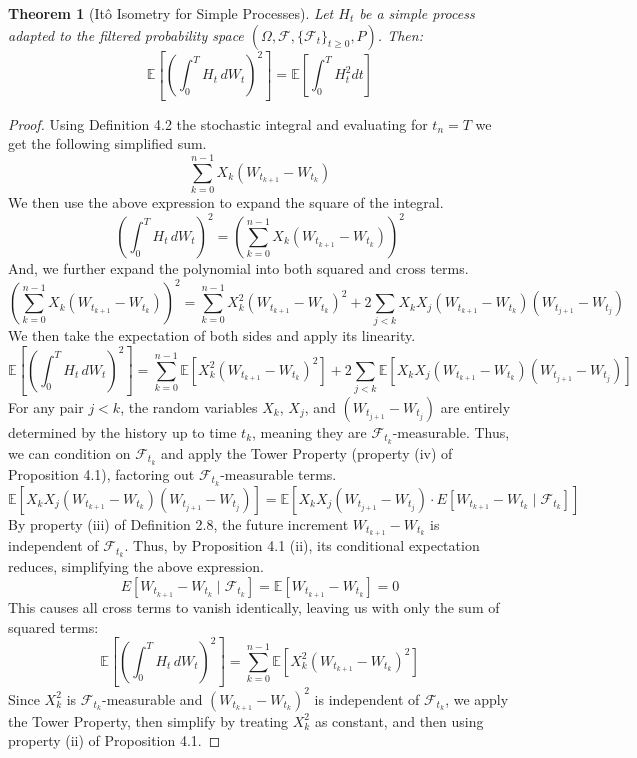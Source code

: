 \documentclass[12pt]{article}
\theoremstyle{definition}
\theoremstyle{plain}
\newtheorem{theorem}{Theorem}[section]
\theoremstyle{remark}
\begin{document}
\begin{theorem}[It\^o Isometry for Simple Processes]
Let $H_t$ be a simple process adapted to the filtered probability space $(\Omega, \mathcal{F}, \{\mathcal{F}_t\}_{t \geq 0}, P)$. Then:
\[
\mathbb{E} \left[ \left(\int_0^T H_t \, dW_t \right)^2 \right] = \mathbb{E} \left[ \int_0^T H_t^2 dt \right]
\]
\end{theorem}

\begin{proof}
Using Definition 4.2 the stochastic integral and evaluating for $t_n = T$ we get the following simplified sum.
\[
\sum_{k=0}^{n-1} X_k (W_{t_{k+1}} - W_{t_k})
\]
We then use the above expression to expand the square of the integral.
\[
\left(\int_0^T H_t \, dW_t \right)^2 = \left(\sum_{k=0}^{n-1} X_k (W_{t_{k+1}} - W_{t_k}) \right)^2
\]
And, we further expand the polynomial into both squared and cross terms.
\[
\left(\sum_{k=0}^{n-1} X_k (W_{t_{k+1}} - W_{t_k}) \right)^2 = \sum_{k=0}^{n-1} X_k^2 (W_{t_{k+1}} - W_{t_k})^2 + 2 \sum_{j<k} X_k X_j (W_{t_{k+1}} - W_{t_k})(W_{t_{j+1}} - W_{t_j})
\]
We then take the expectation of both sides and apply its linearity.
\[
\mathbb{E} \left[ \left(\int_0^T H_t \, dW_t \right)^2 \right] = \sum_{k=0}^{n-1} \mathbb{E} \left[ X_k^2 (W_{t_{k+1}} - W_{t_k})^2 \right] + 2 \sum_{j<k} \mathbb{E} \left[ X_k X_j (W_{t_{k+1}} - W_{t_k})(W_{t_{j+1}} - W_{t_j}) \right]
\]
For any pair $j < k$, the random variables $X_k$, $X_j$, and $(W_{t_{j+1}} - W_{t_j})$ are entirely determined by the history up to time $t_k$, meaning they are $\mathcal{F}_{t_k}$-measurable. Thus, we can condition on $\mathcal{F}_{t_k}$ and apply the Tower Property (property (iv) of Proposition 4.1), factoring out $\mathcal{F}_{t_k}$-measurable terms.
\[
\mathbb{E} \left[ X_k X_j (W_{t_{k+1}} - W_{t_k})(W_{t_{j+1}} - W_{t_j}) \right] = \mathbb{E} \left[ X_k X_j (W_{t_{j+1}} - W_{t_j}) \cdot E[W_{t_{k+1}} - W_{t_k} \mid \mathcal{F}_{t_k}] \right]
\]
By property (iii) of Definition 2.8, the future increment $W_{t_{k+1}} - W_{t_k}$ is independent of $\mathcal{F}_{t_k}$. Thus, by Proposition 4.1 (ii), its conditional expectation reduces, simplifying the above expression.
\[
E[W_{t_{k+1}} - W_{t_k} \mid \mathcal{F}_{t_k}] = \mathbb{E}[W_{t_{k+1}} - W_{t_k}] = 0
\]
This causes all cross terms to vanish identically, leaving us with only the sum of squared terms:
\[
\mathbb{E} \left[ \left(\int_0^T H_t \, dW_t \right)^2 \right] = \sum_{k=0}^{n-1} \mathbb{E} \left[ X_k^2 (W_{t_{k+1}} - W_{t_k})^2 \right]
\]
Since $X_k^2$ is $\mathcal{F}_{t_k}$-measurable and $(W_{t_{k+1}} - W_{t_k})^2$ is independent of $\mathcal{F}_{t_k}$, we apply the Tower Property, then simplify by treating $X_k^2$ as constant, and then using property (ii) of Proposition 4.1.

\end{proof}
\end{document}
